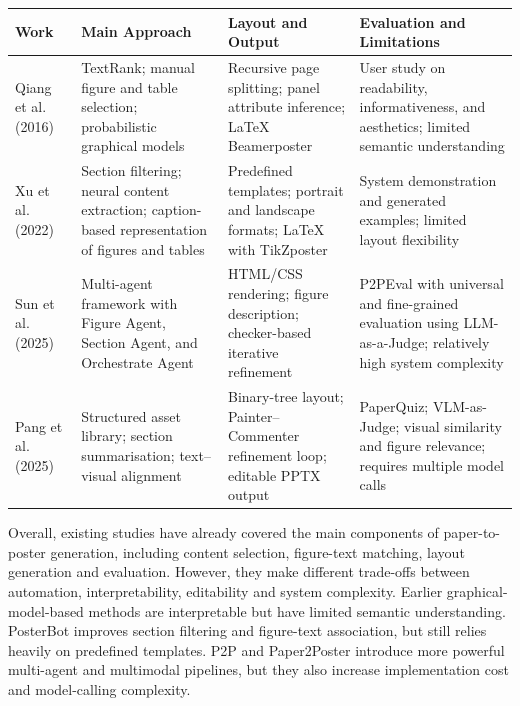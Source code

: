 \documentclass[12pt,oneside]{report}
\begin{document}
\begin{table}[htbp]
\centering
\begin{tabularx}{\textwidth}{p{2.5cm}YYY}
\toprule
\textbf{Work} & \textbf{Main Approach} & \textbf{Layout and Output} & \textbf{Evaluation and Limitations} \\
\midrule

Qiang et al. (2016)~\cite{poster2016}
& TextRank; manual figure and table selection; probabilistic graphical models
& Recursive page splitting; panel attribute inference; LaTeX Beamerposter
& User study on readability, informativeness, and aesthetics; limited semantic understanding \\

\midrule

Xu et al. (2022)~\cite{posterbot}
& Section filtering; neural content extraction; caption-based representation of figures and tables
& Predefined templates; portrait and landscape formats; LaTeX with TikZposter
& System demonstration and generated examples; limited layout flexibility \\

\midrule

Sun et al. (2025)~\cite{p2p}
& Multi-agent framework with Figure Agent, Section Agent, and Orchestrate Agent
& HTML/CSS rendering; figure description; checker-based iterative refinement
& P2PEval with universal and fine-grained evaluation using LLM-as-a-Judge; relatively high system complexity \\

\midrule

Pang et al. (2025)~\cite{paper2poster}
& Structured asset library; section summarisation; text--visual alignment
& Binary-tree layout; Painter--Commenter refinement loop; editable PPTX output
& PaperQuiz; VLM-as-Judge; visual similarity and figure relevance; requires multiple model calls \\

\bottomrule
\end{tabularx}
\end{table}


Overall, existing studies have already covered the main components of paper-to-poster generation, including content selection, figure-text matching, layout generation and evaluation. However, they make different trade-offs between automation, interpretability, editability and system complexity. Earlier graphical-model-based methods are interpretable but have limited semantic understanding. PosterBot improves section filtering and figure-text association, but still relies heavily on predefined templates. P2P and Paper2Poster introduce more powerful multi-agent and multimodal pipelines, but they also increase implementation cost and model-calling complexity.
\end{document}
